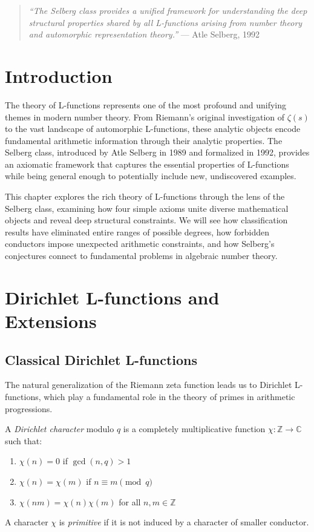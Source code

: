 
\begin{quote}
\textit{``The Selberg class provides a unified framework for understanding the deep structural properties shared by all L-functions arising from number theory and automorphic representation theory.''} --- Atle Selberg, 1992 \cite{selberg1992}
\end{quote}

\section{Introduction}

The theory of L-functions represents one of the most profound and unifying themes in modern number theory. From Riemann's original investigation of $\zeta(s)$ to the vast landscape of automorphic L-functions, these analytic objects encode fundamental arithmetic information through their analytic properties. The Selberg class, introduced by Atle Selberg in 1989 and formalized in 1992, provides an axiomatic framework that captures the essential properties of L-functions while being general enough to potentially include new, undiscovered examples.

This chapter explores the rich theory of L-functions through the lens of the Selberg class, examining how four simple axioms unite diverse mathematical objects and reveal deep structural constraints. We will see how classification results have eliminated entire ranges of possible degrees, how forbidden conductors impose unexpected arithmetic constraints, and how Selberg's conjectures connect to fundamental problems in algebraic number theory.

\section{Dirichlet L-functions and Extensions}
\label{sec:dirichlet-l-functions}

\subsection{Classical Dirichlet L-functions}

The natural generalization of the Riemann zeta function leads us to Dirichlet L-functions, which play a fundamental role in the theory of primes in arithmetic progressions.

\begin{definition}
A \emph{Dirichlet character} modulo $q$ is a completely multiplicative function $\chi: \mathbb{Z} \to \mathbb{C}$ such that:
\begin{enumerate}
\item $\chi(n) = 0$ if $\gcd(n,q) > 1$
\item $\chi(n) = \chi(m)$ if $n \equiv m \pmod{q}$
\item $\chi(nm) = \chi(n)\chi(m)$ for all $n,m \in \mathbb{Z}$
\end{enumerate}
A character $\chi$ is \emph{primitive} if it is not induced by a character of smaller conductor.
\end{definition}

